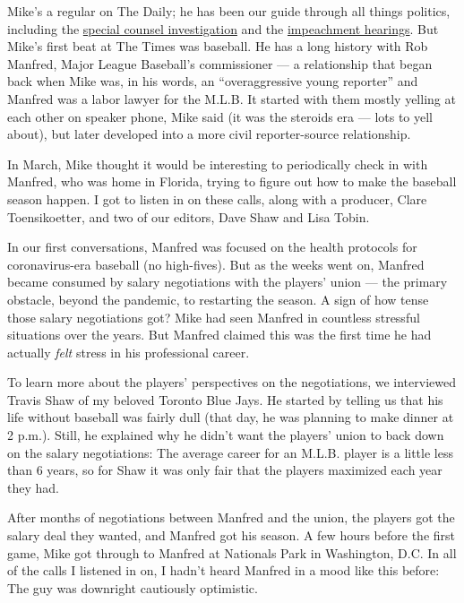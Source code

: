 Mike's a regular on The Daily; he has been our guide through all things
politics, including the
\href{https://www.nytimes.com/2019/05/30/podcasts/the-daily/mueller-special-counsel.html}{special
counsel investigation} and the
\href{https://www.nytimes.com/2019/11/13/podcasts/the-daily/impeachment-hearings.html}{impeachment
hearings}. But Mike's first beat at The Times was baseball. He has a
long history with Rob Manfred, Major League Baseball's commissioner ---
a relationship that began back when Mike was, in his words, an
``overaggressive young reporter'' and Manfred was a labor lawyer for the
M.L.B. It started with them mostly yelling at each other on speaker
phone, Mike said (it was the steroids era --- lots to yell about), but
later developed into a more civil reporter-source relationship.

In March, Mike thought it would be interesting to periodically check in
with Manfred, who was home in Florida, trying to figure out how to make
the baseball season happen. I got to listen in on these calls, along
with a producer, Clare Toensikoetter, and two of our editors, Dave Shaw
and Lisa Tobin.

In our first conversations, Manfred was focused on the health protocols
for coronavirus-era baseball (no high-fives). But as the weeks went on,
Manfred became consumed by salary negotiations with the players' union
--- the primary obstacle, beyond the pandemic, to restarting the season.
A sign of how tense those salary negotiations got? Mike had seen Manfred
in countless stressful situations over the years. But Manfred claimed
this was the first time he had actually \emph{felt} stress in his
professional career.

To learn more about the players' perspectives on the negotiations, we
interviewed Travis Shaw of my beloved Toronto Blue Jays. He started by
telling us that his life without baseball was fairly dull (that day, he
was planning to make dinner at 2 p.m.). Still, he explained why he
didn't want the players' union to back down on the salary negotiations:
The average career for an M.L.B. player is a little less than 6 years,
so for Shaw it was only fair that the players maximized each year they
had.

After months of negotiations between Manfred and the union, the players
got the salary deal they wanted, and Manfred got his season. A few hours
before the first game, Mike got through to Manfred at Nationals Park in
Washington, D.C. In all of the calls I listened in on, I hadn't heard
Manfred in a mood like this before: The guy was downright cautiously
optimistic.

